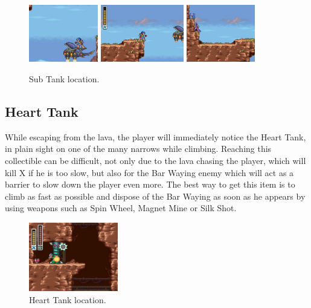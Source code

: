 \begin{figure}[htp]
	\centering
	\includegraphics[height=2.5cm]{figures/X2/Flame_stag/Stag_tank_2.jpg}
	\includegraphics[height=2.5cm]{figures/X2/Flame_stag/Stag_tank_3.jpg}
	\includegraphics[height=2.5cm]{figures/X2/Flame_stag/Stag_tank.png}	
	\caption{Sub Tank location.}
\end{figure}


\subsection{Heart Tank}
While escaping from the lava, the player will immediately notice the Heart Tank, in plain sight on one of the many narrows while climbing. Reaching this collectible can be difficult, not only due to the lava chasing the player, which will kill X if he is too slow, but also for the Bar Waying enemy which will act as a barrier to slow down the player even more. The best way to get this item is to climb as fast as possible and dispose of the Bar Waying as soon as he appears by using weapons such as Spin Wheel, Magnet Mine or Silk Shot.
\begin{figure}[htp]
	\centering
	\includegraphics[height=3cm]{figures/X2/Flame_stag/Stag_heart.png}
	\caption{Heart Tank location.}
\end{figure}

